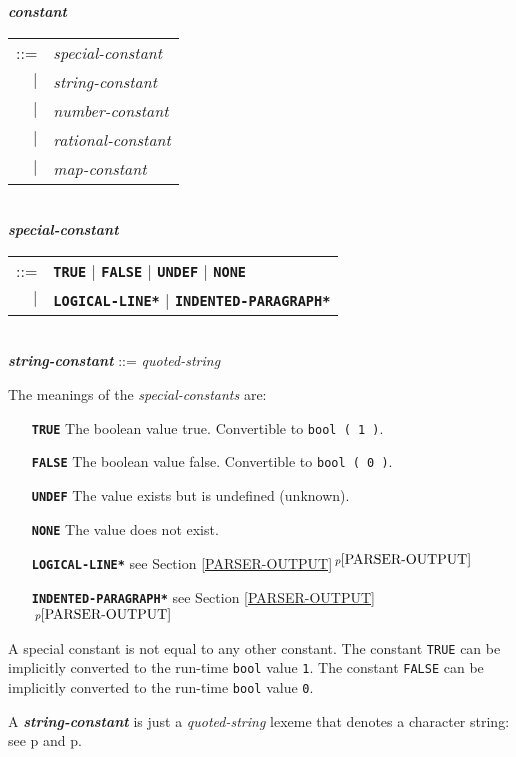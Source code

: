 \documentclass[12pt]{article}
\newcommand{\TT}[1]{{\tt \bfseries #1}}
\newcommand{\ttkey}[1]{{\tt \bfseries #1}}
\newcommand{\emkey}[1]{{\em \bfseries #1}}
\newcommand{\itemref}[1]{\ref{#1}$\,^{p\pageref{#1}}$}
\newcommand{\pagref}[1]{p\pageref{#1}}
\newenvironment{indpar}[1][0.3in]%
	{\begin{list}{}%
		     {\setlength{\itemsep}{0in}%
		      \setlength{\topsep}{0in}%
		      \setlength{\parsep}{1ex}%
		      \setlength{\labelwidth}{#1}%
		      \setlength{\leftmargin}{#1}%
		      \addtolength{\leftmargin}{\labelsep}}%
	 \item}%
	{\end{list}}
\begin{document}
\begin{indpar}
\emkey{constant}\label{CONSTANT}
    \begin{tabular}[t]{rl}
    ::= & {\em special-constant} \\
    $|$ & {\em string-constant} \\
    $|$ & {\em number-constant} \\
    $|$ & {\em rational-constant} \\
    $|$ & {\em map-constant} \\
    \end{tabular} \\
\emkey{special-constant} 
    \begin{tabular}[t]{@{}rl}
    ::= & \ttkey{TRUE} $|$ \ttkey{FALSE}
                       $|$ \ttkey{UNDEF} $|$ \ttkey{NONE} \\
    $|$ & \ttkey{*LOGICAL-LINE*} $|$ \ttkey{*INDENTED-PARAGRAPH*} \\
    \end{tabular} \\
\emkey{string-constant}\label{STRING-CONSTANT} ::= {\em quoted-string}
\end{indpar}

The meanings of the {\em special-constants} are:
\begin{indpar}[1.6in]
\begin{itemize}
\item[\TT{TRUE}] The boolean value true.  Convertible to {\tt bool ( 1 )}.
\item[\TT{FALSE}] The boolean value false.  Convertible to {\tt bool ( 0 )}.
\item[\TT{UNDEF}] The value exists but is undefined (unknown).
\item[\TT{NONE}] The value does not exist.
\item[\TT{*LOGICAL-LINE*}] see Section \itemref{PARSER-OUTPUT}
\item[\TT{*INDENTED-PARAGRAPH*}] see Section \itemref{PARSER-OUTPUT}
\end{itemize}
\end{indpar}
A special constant is not equal to any other constant.
The constant {\tt TRUE} can be implicitly converted to the
run-time {\tt bool} value {\tt 1}.
The constant {\tt FALSE} can be implicitly converted to the
run-time {\tt bool} value {\tt 0}.

A \emkey{string-constant} is just a {\em quoted-string} lexeme
that denotes a character string: see
\pagref{QUOTED-STRING} and \pagref{QUOTED-STRING-CONCATENATION}.
\end{document}
